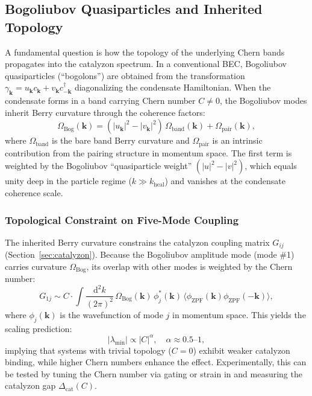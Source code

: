 \documentclass[11pt,letterpaper]{article}
\begin{document}
\subsection{Bogoliubov Quasiparticles and Inherited Topology}
\label{sec:bogchern}

A fundamental question is how the topology of the underlying Chern bands propagates into the catalyzon spectrum. In a conventional BEC, Bogoliubov quasiparticles (``bogolons'') are obtained from the transformation $\gamma_{\mathbf{k}} = u_{\mathbf{k}} c_{\mathbf{k}} + v_{\mathbf{k}} c_{-\mathbf{k}}^\dagger$ diagonalizing the condensate Hamiltonian. When the condensate forms in a band carrying Chern number $C \neq 0$, the Bogoliubov modes inherit Berry curvature through the coherence factors:
\begin{equation}
\Omega_{\text{Bog}}(\mathbf{k}) = (|u_{\mathbf{k}}|^2 - |v_{\mathbf{k}}|^2) \, \Omega_{\text{band}}(\mathbf{k}) + \Omega_{\text{pair}}(\mathbf{k}),
\label{eq:bog_berry}
\end{equation}
where $\Omega_{\text{band}}$ is the bare band Berry curvature and $\Omega_{\text{pair}}$ is an intrinsic contribution from the pairing structure in momentum space. The first term is weighted by the Bogoliubov ``quasiparticle weight'' $(|u|^2 - |v|^2)$, which equals unity deep in the particle regime ($k \gg k_{\text{heal}}$) and vanishes at the condensate coherence scale.

\subsubsection{Topological Constraint on Five-Mode Coupling}

The inherited Berry curvature constrains the catalyzon coupling matrix $G_{ij}$ (Section~\ref{sec:catalyzon}). Because the Bogoliubov amplitude mode (mode \#1) carries curvature $\Omega_{\text{Bog}}$, its overlap with other modes is weighted by the Chern number:
\begin{equation}
G_{1j} \sim C \cdot \int \frac{\mathrm{d}^2 k}{(2\pi)^2} \, \Omega_{\text{Bog}}(\mathbf{k}) \, \phi_j^*(\mathbf{k}) \, \langle \phi_{\text{ZPF}}(\mathbf{k}) \phi_{\text{ZPF}}(-\mathbf{k}) \rangle,
\label{eq:G1j_chern}
\end{equation}
where $\phi_j(\mathbf{k})$ is the wavefunction of mode $j$ in momentum space. This yields the scaling prediction:
\begin{equation}
|\lambda_{\min}| \propto |C|^\alpha, \quad \alpha \approx 0.5\text{--}1,
\end{equation}
implying that systems with trivial topology ($C = 0$) exhibit weaker catalyzon binding, while higher Chern numbers enhance the \QVC{} effect. Experimentally, this can be tested by tuning the Chern number via gating or strain in \MATBG{} and measuring the catalyzon gap $\Delta_{\text{cat}}(C)$.
\end{document}
